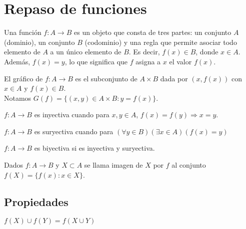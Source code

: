 \section{Repaso de funciones}

Una función $f: A \to B$ es un objeto que consta de tres partes: un conjunto $A$ (dominio), un conjunto $B$ (codominio) y una regla que permite asociar todo elemento de $A$ a un único elemento de $B$. Es decir, $f(x) \in B$, donde $x \in A$.
Además, $f(x) = y$, lo que significa que $f$ asigna a $x$ el valor $f(x)$.

El gráfico de $f: A \to B$ es el subconjunto de $A \times B$ dada por $(x, f(x))$ con $x \in A$ y $f(x) \in B$.\\
Notamos $G(f) = \{ (x, y) \in A \times B : y = f(x) \}$.

\begin{definition}[Inyectividad]
    $f: A \to B$ es inyectiva cuando para $x, y \in A$, $f(x) = f(y) \Rightarrow x = y$.
\end{definition}

\begin{definition}[Suryectividad]
    $f: A \to B$ es suryectiva cuando para $(\forall y\in B)(\exists x\in A)(f(x) = y)$
\end{definition}

\begin{definition}[Biyectividad]
    $f: A \to B$ es biyectiva si es inyectiva y suryectiva.
\end{definition}

\begin{definition}[Imagen]
    Dados $f: A \to B$ y $X \subset A$ se llama imagen de $X$ por $f$ al conjunto $f(X) = \{f(x) : x \in X\}$.
\end{definition}

\subsection{Propiedades}

\begin{prop}
    $f(X) \cup f(Y) = f(X \cup Y)$
\end{prop}


